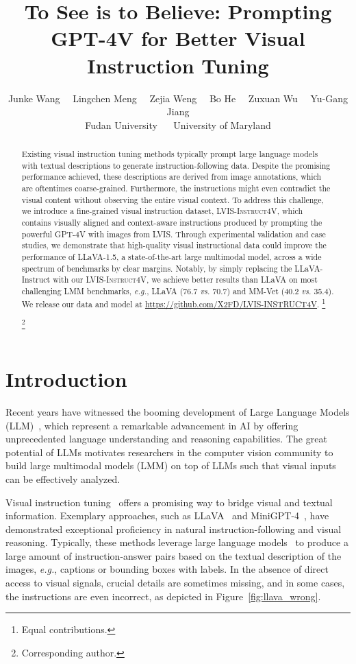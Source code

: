 \documentclass{article}
\title{To See is to Believe: Prompting GPT-4V for Better Visual Instruction Tuning}
\author{Junke Wang \ \ 
Lingchen Meng \ \ 
Zejia Weng \ \  
Bo He \ \ 
Zuxuan Wu \ \  
Yu-Gang Jiang \vspace{0.1in}\\
{Fudan University} \ \ { University of Maryland} 
}
\makeatletter
\newcommand\blfootnote[1]{\begingroup
  \renewcommand\thefootnote{}\footnote{#1}\addtocounter{footnote}{-1}\endgroup
}
\newcommand{\dataname}{\textsc{LVIS-Instruct4V}\xspace}
\newcommand*{\eg}{\emph{e.g.}\@\xspace}
\newcommand*{\vs}{\emph{vs.}\@\xspace}
\makeatother
\begin{document}
\maketitle
\begin{abstract}
Existing visual instruction tuning methods typically prompt large language models with textual descriptions to generate instruction-following data. Despite the promising performance achieved, these descriptions are derived from image annotations, which are oftentimes coarse-grained. Furthermore, the instructions might even contradict the visual content without observing the entire visual context. To address this challenge, we introduce a fine-grained visual instruction dataset, \dataname, which contains  visually aligned and context-aware instructions produced by prompting the powerful GPT-4V with images from LVIS. 
Through experimental validation and case studies, we demonstrate that high-quality visual instructional data could improve the performance of LLaVA-1.5, a state-of-the-art large multimodal model, across a wide spectrum of benchmarks by clear margins. Notably, by simply replacing the LLaVA-Instruct with our \dataname, we achieve better results than LLaVA on most challenging LMM benchmarks, \eg, LLaVA (76.7 \vs 70.7) and MM-Vet (40.2 \vs 35.4). We release our data and model at \url{https://github.com/X2FD/LVIS-INSTRUCT4V}.
\blfootnote{ Equal contributions.}
\blfootnote{Corresponding author.}
\end{abstract}


 \section{Introduction}
\label{sec:intro}
Recent years have witnessed the booming development of Large Language Models (LLM)~\cite{brown2020language,zhang2022opt,touvron2023llama,touvron2023llama2}, which represent a remarkable advancement in AI by offering unprecedented language understanding and reasoning capabilities. The great potential of LLMs motivates researchers in the computer vision community to build large multimodal models (LMM) on top of LLMs such that visual inputs can be effectively analyzed.


Visual instruction tuning~\cite{liu2023visual} offers a promising way to bridge visual and textual information. Exemplary approaches, such as LLaVA~\cite{li2023llava,liu2023improved} and MiniGPT-4~\cite{zhu2023minigpt}, have demonstrated exceptional proficiency in natural instruction-following and visual reasoning. Typically, these methods leverage large language models~\cite{chatgpt,gpt4} to produce a large amount of instruction-answer pairs based on the textual description of the images, \eg, captions or bounding boxes with labels. In the absence of direct access to visual signals, crucial details are sometimes missing, and in some cases, the instructions are even incorrect, as depicted in Figure~\ref{fig:llava_wrong}.
\end{document}
